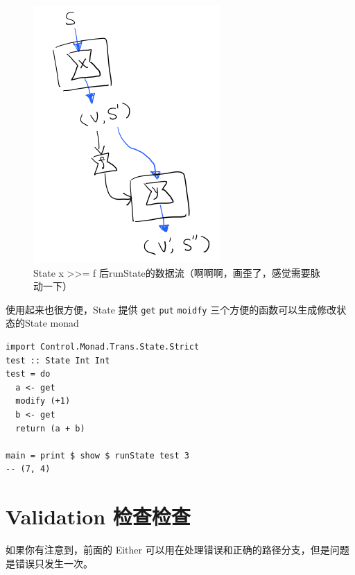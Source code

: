 \documentclass[11pt]{tufte-book}
\begin{document}
\begin{figure}[htbp]
\centering
\includegraphics[width=.9\linewidth]{images/p2-state-monad-bind.png}
\caption{State x >>= f 后runState的数据流（啊啊啊，画歪了，感觉需要脉动一下）}
\end{figure}

使用起来也很方便，State 提供 \texttt{get} \texttt{put} \texttt{moidfy} 三个方便的函数可以生成修改状态的State monad

\begin{verbatim}
import Control.Monad.Trans.State.Strict
test :: State Int Int
test = do
  a <- get
  modify (+1)
  b <- get
  return (a + b)

main = print $ show $ runState test 3
-- (7, 4)
\end{verbatim}


\chapter{Validation 检查检查}
\label{sec:org7d09bfd}
如果你有注意到，前面的 Either 可以用在处理错误和正确的路径分支，但是问题是错误只发生一次。
\end{document}
